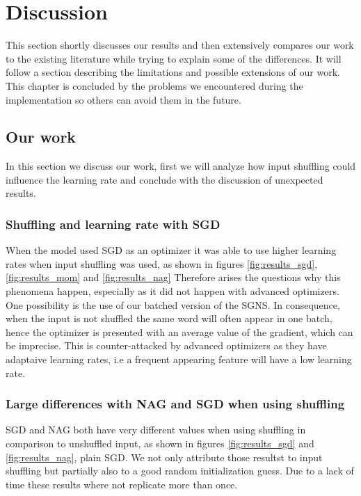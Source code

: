 \chapter{Discussion}\label{chap:discussion}



This section shortly discusses our results and then extensively compares our work to the existing literature while trying to explain some of the differences. It will follow a section describing the limitations and possible extensions of our work. This chapter is concluded by the problems we encountered during the implementation so others can avoid them in the future.

\section{Our work}
In this section we discuss our work, first we will analyze how input shuffling could influence the learning rate and conclude with the discussion of unexpected results.

\subsection{Shuffling and learning rate with SGD}
When the model used SGD as an optimizer it was able to use higher learning rates when input shuffling was used, as shown in figures \ref{fig:results_sgd}, \ref{fig:results_mom} and \ref{fig:results_nag} Therefore arises the questions why this phenomena happen, especially as it did not happen with advanced optimizers.  One possibility is the use of our batched version of the SGNS. In consequence, when the input is not shuffled the same word will often appear in one batch, hence the optimizer is presented with an average value of the gradient, which can be imprecise. This is counter-attacked by advanced optimizers as they have adaptaive learning rates, i.e a frequent appearing feature will have a low learning rate.  

\subsection{Large differences with NAG and SGD when using shuffling}
SGD and NAG both have very different values when using shuffling in comparison to unshuffled input, as shown in figures \ref{fig:results_sgd} and \ref{fig:results_nag}, plain SGD. We  not only attribute those resultst to input shuffling but partially also to a good random initialization guess. Due to a lack of time these results where not replicate more than once. 

